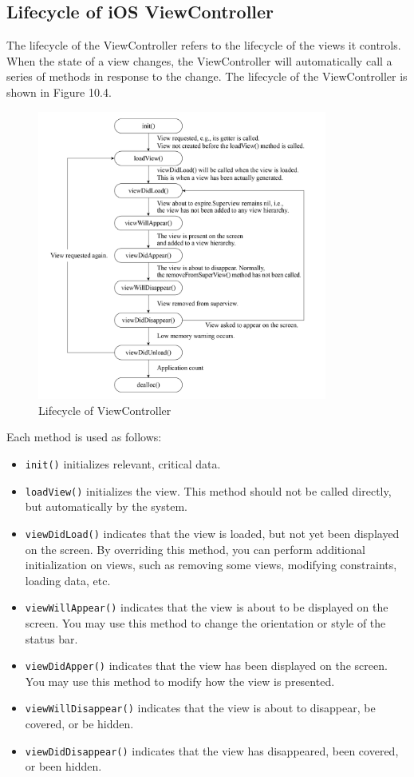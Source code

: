 \documentclass[a4paper,12pt,openany]{book}
\begin{document}
\subsection{Lifecycle of iOS ViewController}
The lifecycle of the ViewController refers to the lifecycle of the views it controls. When the state of a view changes, the ViewController will automatically call a series of methods in response to the change. The lifecycle of the ViewController is shown in Figure 10.4.

\begin{figure}[ht]
    \centering
    \includegraphics[width=0.85\textwidth]{D10Z/10-4}
    \caption{Lifecycle of ViewController}
\end{figure}

Each method is used as follows:

\begin{itemize}
    \item \verb|init()| initializes relevant, critical data.
    \item \verb|loadView()| initializes the view. This method should not be called directly, but automatically by the system.
    \item \verb|viewDidLoad()| indicates that the view is loaded, but not yet been displayed on the screen. By overriding this method, you can perform additional initialization on views, such as removing some views, modifying constraints, loading data, etc.
    \item \verb|viewWillAppear()| indicates that the view is about to be displayed on the screen. You may use this method to change the orientation or style of the status bar.
    \item \verb|viewDidApper()| indicates that the view has been displayed on the screen. You may use this method to modify how the view is presented.
    \item \verb|viewWillDisappear()| indicates that the view is about to disappear, be covered, or be hidden.
    \item \verb|viewDidDisappear()| indicates that the view has disappeared, been covered, or been hidden.
\end{itemize}
\end{document}
